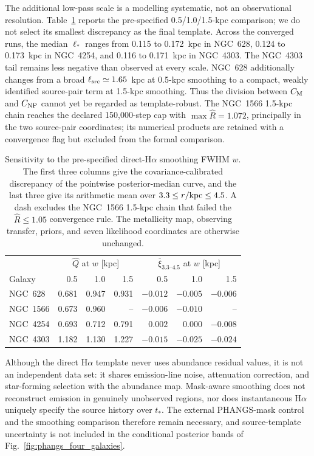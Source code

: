 \documentclass[fleqn,usenatbib]{mnras}
\begin{document}
The additional low-pass scale is a modelling systematic, not an observational resolution.  Table~\ref{tab:phangs_halpha_smoothing} reports the pre-specified 0.5/1.0/1.5-kpc comparison; we do not select its smallest discrepancy as the final template.  Across the converged runs, the median $\ell_\ast$ ranges from 0.115 to 0.172~kpc in NGC~628, 0.124 to 0.173~kpc in NGC~4254, and 0.116 to 0.171~kpc in NGC~4303.  The NGC~4303 tail remains less negative than observed at every scale.  NGC~628 additionally changes from a broad $\ell_{\rm src}\simeq1.65$~kpc at 0.5-kpc smoothing to a compact, weakly identified source-pair term at 1.5-kpc smoothing.  Thus the division between $C_{\rm M}$ and $C_{\rm NP}$ cannot yet be regarded as template-robust.  The NGC~1566 1.5-kpc chain reaches the declared 150,000-step cap with $\max\widehat R=1.072$, principally in the two source-pair coordinates; its numerical products are retained with a convergence flag but excluded from the formal comparison.

\begin{table}
\centering
\small
\caption{Sensitivity to the pre-specified direct-H$\alpha$ smoothing FWHM $w$.  The first three columns give the covariance-calibrated discrepancy of the pointwise posterior-median curve, and the last three give its arithmetic mean over $3.3\leq r/{\rm kpc}\leq4.5$.  A dash excludes the NGC~1566 1.5-kpc chain that failed the $\widehat R\leq1.05$ convergence rule.  The metallicity map, observing transfer, priors, and seven likelihood coordinates are otherwise unchanged.}
\label{tab:phangs_halpha_smoothing}
\begin{tabular}{@{}lrrrrrr@{}}
\toprule
 & \multicolumn{3}{c}{$\widehat Q$ at $w$ [kpc]} & \multicolumn{3}{c}{$\overline\xi_{3.3\text{--}4.5}$ at $w$ [kpc]}\\
Galaxy & 0.5 & 1.0 & 1.5 & 0.5 & 1.0 & 1.5\\
\midrule
NGC~628  & 0.681 & 0.947 & 0.931 & $-0.012$ & $-0.005$ & $-0.006$\\
NGC~1566 & 0.673 & 0.960 & --    & $-0.006$ & $-0.010$ & --\\
NGC~4254 & 0.693 & 0.712 & 0.791 & $ 0.002$ & $ 0.000$ & $-0.008$\\
NGC~4303 & 1.182 & 1.130 & 1.227 & $-0.015$ & $-0.025$ & $-0.024$\\
\bottomrule
\end{tabular}
\end{table}

Although the direct H$\alpha$ template never uses abundance residual values, it is not an independent data set: it shares emission-line noise, attenuation correction, and star-forming selection with the abundance map.  Mask-aware smoothing does not reconstruct emission in genuinely unobserved regions, nor does instantaneous H$\alpha$ uniquely specify the source history over $t_\ast$.  The external PHANGS-mask control and the smoothing comparison therefore remain necessary, and source-template uncertainty is not included in the conditional posterior bands of Fig.~\ref{fig:phangs_four_galaxies}.
\end{document}
